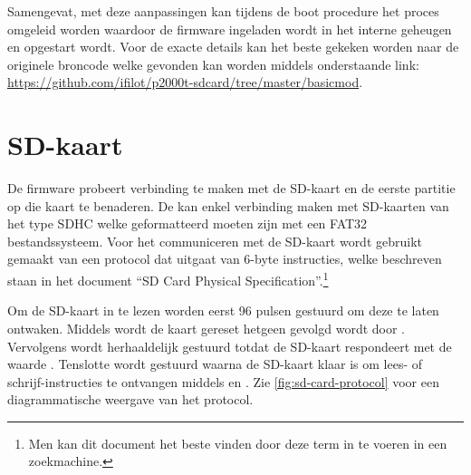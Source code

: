 Samengevat, met deze aanpassingen kan tijdens de  boot procedure het proces omgeleid worden waardoor de firmware ingeladen wordt in het interne geheugen en opgestart wordt. Voor de exacte details kan het beste gekeken worden naar de originele broncode welke gevonden kan worden middels onderstaande link:\\
\url{https://github.com/ifilot/p2000t-sdcard/tree/master/basicmod}.

%
%
%
\section{SD-kaart}

De firmware probeert verbinding te maken met de SD-kaart en de eerste partitie op die kaart te benaderen. De \product kan enkel verbinding maken met SD-kaarten van het type SDHC welke geformatteerd moeten zijn met een FAT32 bestandssysteem. Voor het communiceren met de SD-kaart wordt gebruikt gemaakt van een protocol dat uitgaat van 6-byte instructies, welke beschreven staan in het document ``SD Card Physical Specification''.\footnote{Men kan dit document het beste vinden door deze term in te voeren in een zoekmachine.}

Om de SD-kaart in te lezen worden eerst 96 pulsen gestuurd om deze te laten ontwaken. Middels  wordt de kaart gereset hetgeen gevolgd wordt door . Vervolgens wordt herhaaldelijk  gestuurd totdat de SD-kaart respondeert met de waarde . Tenslotte wordt  gestuurd waarna de SD-kaart klaar is om lees- of schrijf-instructies te ontvangen middels  en . Zie \cref{fig:sd-card-protocol} voor een diagrammatische weergave van het protocol.

